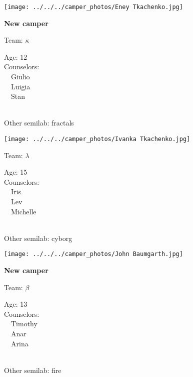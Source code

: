 \documentclass[10pt,letterpaper, landscape]{article}
\begin{document}
\horizontalshiftfornextsticker
\renewcommand{\baselinestretch}{1} \begin{sticker}
\noindent\begin{minipage}{0.5\textwidth}\texttt{[image: ../../../camper\_photos/Eney Tkachenko.jpg]}\end{minipage}\begin{minipage}{0.45\textwidth}
\textbf{New camper} 

Team: {\Large $\kappa$}

Age:        12\\
Counselors: \\\ \ Giulio\\\ \ Luigia\\\ \ Stan\\
\end{minipage} \\ \vspace{0.07in}
Other semilab: fractals
\end{sticker}
\horizontalshiftfornextsticker
\renewcommand{\baselinestretch}{1} \begin{sticker}
\noindent\begin{minipage}{0.5\textwidth}\texttt{[image: ../../../camper\_photos/Ivanka Tkachenko.jpg]}\end{minipage}\begin{minipage}{0.45\textwidth}
Team: {\Large $\lambda$}

Age:        15\\
Counselors: \\\ \ Iris\\\ \ Lev\\\ \ Michelle\\
\end{minipage} \\ \vspace{0.07in}
Other semilab: cyborg
\end{sticker}
\verticalshiftfornextsticker
\renewcommand{\baselinestretch}{1} \begin{sticker}
\noindent\begin{minipage}{0.5\textwidth}\texttt{[image: ../../../camper\_photos/John Baumgarth.jpg]}\end{minipage}\begin{minipage}{0.45\textwidth}
\textbf{New camper} 

Team: {\Large $\beta$}

Age:        13\\
Counselors: \\\ \ Timothy\\\ \ Anar\\\ \ Arina\\
\end{minipage} \\ \vspace{0.07in}
Other semilab: fire
\end{sticker}
\end{document}
